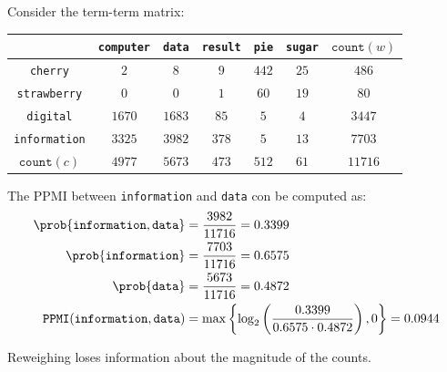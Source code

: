 \begin{description}
\begin{description}
                \begin{example}
                    Consider the term-term matrix:
                    \begin{table}[H]
                        \centering
                        \footnotesize
                        \begin{tabular}{cccccc|c}
                            \toprule
                            & \texttt{computer} & \texttt{data} & \texttt{result} & \texttt{pie} & \texttt{sugar} & $\texttt{count}(w)$ \\
                            \midrule
                            \texttt{cherry} & $2$ & $8$ & $9$ & $442$ & $25$ & $486$ \\
                            \texttt{strawberry} & $0$ & $0$ & $1$ & $60$ & $19$ & $80$ \\
                            \texttt{digital} & $1670$ & $1683$ & $85$ & $5$ & $4$ & $3447$ \\
                            \texttt{information} & $3325$ & $3982$ & $378$ & $5$ & $13$ & $7703$ \\
                            \midrule
                            $\texttt{count}(c)$ & $4977$ & $5673$ & $473$ & $512$ & $61$ & $11716$ \\
                            \bottomrule
                        \end{tabular}
                    \end{table}
                    The PPMI between \texttt{information} and \texttt{data} con be computed as:
                    \[
                        \begin{split}
                            \prob{\texttt{information}, \texttt{data}} &= \frac{3982}{11716} = 0.3399 \\
                            \prob{\texttt{information}} &= \frac{7703}{11716} = 0.6575 \\
                            \prob{\texttt{data}} &= \frac{5673}{11716} = 0.4872 \\
                            \texttt{PPMI}(\texttt{information}, \texttt{data}) &= \max\left\{ \log_2\left( \frac{0.3399}{0.6575 \cdot 0.4872} \right), 0 \right\} = 0.0944
                        \end{split}
                    \]
                \end{example}
        \end{description}

        \begin{remark}
            Reweighing loses information about the magnitude of the counts.
        \end{remark}


\end{description}
